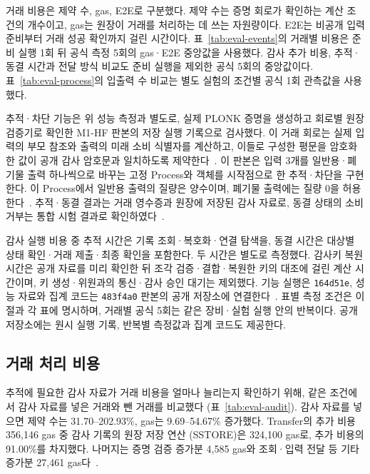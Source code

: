 거래 비용은 제약 수, gas, E2E로 구분했다.
제약 수는 증명 회로가 확인하는 계산 조건의 개수이고,
gas는 원장이 거래를 처리하는 데 쓰는 자원량이다.
E2E는 비공개 입력 준비부터 거래 성공 확인까지 걸린 시간이다.
표~\ref{tab:eval-events}의 거래별 비용은 준비 실행 1회 뒤
공식 측정 5회의 gas·E2E 중앙값을 사용했다.
감사 추가 비용, 추적·동결 시간과 전달 방식 비교도 준비 실행을 제외한
공식 5회의 중앙값이다.
표~\ref{tab:eval-process}의 입출력 수 비교는 별도 실험의
조건별 공식 1회 관측값을 사용했다.

추적·차단 기능은 위 성능 측정과 별도로, 실제 PLONK 증명을 생성하고
회로별 원장 검증기로 확인한 M1-HF 판본의 저장 실행 기록으로 검사했다.
이 거래 회로는 실제 입력의 부모 참조와 출력의 미래 소비 식별자를
계산하고, 이들로 구성한 평문을 암호화한 값이 공개 감사 암호문과
일치하도록 제약한다~\cite{zkdpp-m1hf-execution-2026}.
이 판본은 입력 3개를 일반용·폐기물 출력 하나씩으로 바꾸는
고정 Process와 객체를 시작점으로 한 추적·차단을 구현한다.
이 Process에서 일반용 출력의 질량은 양수이며,
폐기물 출력에는 질량 0을 허용한다~\cite{zkdpp-implementation-profile-2026}.
추적·동결 결과는 거래 영수증과 원장에 저장된 감사 자료로,
동결 상태의 소비 거부는 통합 시험 결과로 확인하였다~\cite{zkdpp-m1hf-execution-2026}.

감사 실행 비용 중 추적 시간은 기록 조회·복호화·연결 탐색을,
동결 시간은 대상별 상태 확인·거래 제출·최종 확인을 포함한다.
두 시간은 별도로 측정했다. 감사키 복원 시간은 공개 자료를
미리 확인한 뒤 조각 검증·결합·복원한 키의 대조에 걸린 계산 시간이며,
키 생성·위원과의 통신·감사 승인 대기는 제외했다.
기능 실행은 \texttt{164d51e}, 성능 자료와 집계 코드는
\texttt{483f4a0} 판본의 공개 저장소에 연결한다~\cite{
zkdpp-m1hf-execution-2026,zkdpp-evaluation-data-2026}.
표별 측정 조건은 이 절과 각 표에 명시하며, 거래별 공식 5회는
같은 장비·실험 실행 안의 반복이다. 공개 저장소에는 원시 실행 기록,
반복별 측정값과 집계 코드도 제공한다.


\subsection{거래 처리 비용}

추적에 필요한 감사 자료가 거래 비용을 얼마나 늘리는지 확인하기 위해,
같은 조건에서 감사 자료를 넣은 거래와 뺀 거래를 비교했다
(표~\ref{tab:eval-audit}). 감사 자료를 넣으면 제약 수는
31.70--202.93\%, gas는 9.69--54.67\% 증가했다.
Transfer의 추가 비용 356,146 gas 중 감사 기록의 원장 저장 연산
(SSTORE)은 324,100 gas로, 추가 비용의 91.00\%를 차지했다.
나머지는 증명 검증 증가분 4,585 gas와 조회·입력 전달 등
기타 증가분 27,461 gas다~\cite{zkdpp-evaluation-data-2026}.


